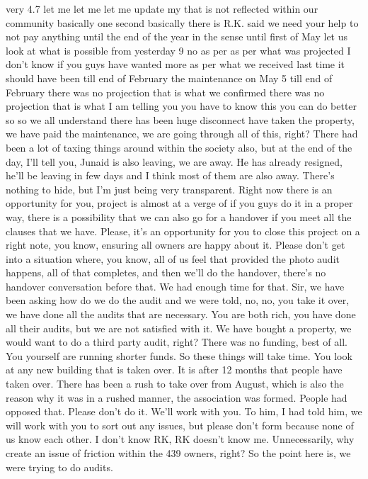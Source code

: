 very
4.7
let me
let me
let me
update my
that is not
reflected within
our community
basically
one second
basically
there is
R.K. said
we need your help
to not pay anything
until the
end of the year
in the sense
until first of May
let us look at
what is possible
from yesterday
9
no
as per
as per
what was projected
I don't know
if you guys have
wanted more
as per
what we received last time
it should have been
till end of February
the maintenance
on May 5
till end of February
there was no
projection
that is what we
confirmed
there was no
projection
that is what
I am telling you
you have to know this
you can do better
so
so
we all
understand
there has been
huge disconnect
have taken the property, we have paid the maintenance, we are going through all of this, right?
There had been a lot of taxing things around within the society also, but at the end of the day,
I'll tell you, Junaid is also leaving, we are away. He has already resigned, he'll be leaving in few days
and I think most of them are also away. There's nothing to hide, but I'm just being very transparent.
Right now there is an opportunity for you, project is almost at a verge of if you guys do it in a proper way,
there is a possibility that we can also go for a handover if you meet all the clauses that we have.
Please, it's an opportunity for you to close this project on a right note, you know,
ensuring all owners are happy about it. Please don't get into a situation where, you know,
all of us feel that provided the photo audit happens, all of that completes,
and then we'll do the handover, there's no handover conversation before that.
We had enough time for that.
Sir, we have been asking how do we do the audit and we were told, no, no, you take it over,
we have done all the audits that are necessary. You are both rich, you have done all their audits,
but we are not satisfied with it. We have bought a property, we would want to do a third party audit, right?
There was no funding, best of all. You yourself are running shorter funds.
So these things will take time. You look at any new building that is taken over.
It is after 12 months that people have taken over. There has been a rush to take over from August,
which is also the reason why it was in a rushed manner, the association was formed.
People had opposed that. Please don't do it. We'll work with you.
To him, I had told him, we will work with you to sort out any issues,
but please don't form because none of us know each other. I don't know RK, RK doesn't know me.
Unnecessarily, why create an issue of friction within the 439 owners, right?
So the point here is, we were trying to do audits.
